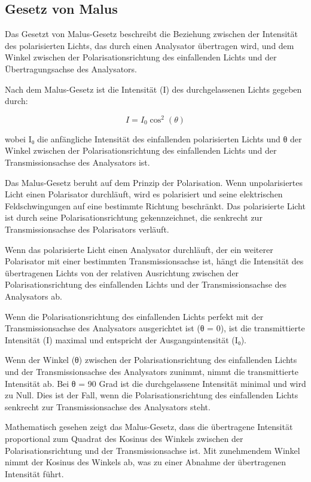 \documentclass[12pt,english,ngerman]{scrartcl}
\begin{document}
\subsection{Gesetz von Malus}

Das Gesetzt von Malus-Gesetz beschreibt die Beziehung zwischen der Intensität
des polarisierten Lichts, das durch einen Analysator übertragen wird, und dem
Winkel zwischen der Polarisationsrichtung des einfallenden Lichts und der
Übertragungsachse des Analysators.

Nach dem Malus-Gesetz ist die Intensität (I) des durchgelassenen Lichts gegeben
durch:

\begin{equation}
	I = I_0  \cos^2(\theta)
\end{equation}


wobei I₀ die anfängliche Intensität des einfallenden polarisierten Lichts und θ
der Winkel zwischen der Polarisationsrichtung des einfallenden Lichts und der
Transmissionsachse des Analysators ist.

Das Malus-Gesetz beruht auf dem Prinzip der Polarisation. Wenn unpolarisiertes
Licht einen Polarisator durchläuft, wird es polarisiert und seine elektrischen
Feldschwingungen auf eine bestimmte Richtung beschränkt. Das polarisierte Licht
ist durch seine Polarisationsrichtung gekennzeichnet, die senkrecht zur
Transmissionsachse des Polarisators verläuft.

Wenn das polarisierte Licht einen Analysator durchläuft, der ein weiterer
Polarisator mit einer bestimmten Transmissionsachse ist, hängt die Intensität
des übertragenen Lichts von der relativen Ausrichtung zwischen der
Polarisationsrichtung des einfallenden Lichts und der Transmissionsachse des
Analysators ab.

Wenn die Polarisationsrichtung des einfallenden Lichts perfekt mit der
Transmissionsachse des Analysators ausgerichtet ist (θ = 0), ist die
transmittierte Intensität (I) maximal und entspricht der Ausgangsintensität
(I₀).

Wenn der Winkel (θ) zwischen der Polarisationsrichtung des einfallenden Lichts
und der Transmissionsachse des Analysators zunimmt, nimmt die transmittierte
Intensität ab. Bei θ = 90 Grad ist die durchgelassene Intensität minimal und
wird zu Null. Dies ist der Fall, wenn die Polarisationsrichtung des
einfallenden Lichts senkrecht zur Transmissionsachse des Analysators steht.

Mathematisch gesehen zeigt das Malus-Gesetz, dass die übertragene Intensität
proportional zum Quadrat des Kosinus des Winkels zwischen der
Polarisationsrichtung und der Transmissionsachse ist. Mit zunehmendem Winkel
nimmt der Kosinus des Winkels ab, was zu einer Abnahme der übertragenen
Intensität führt.
\end{document}
